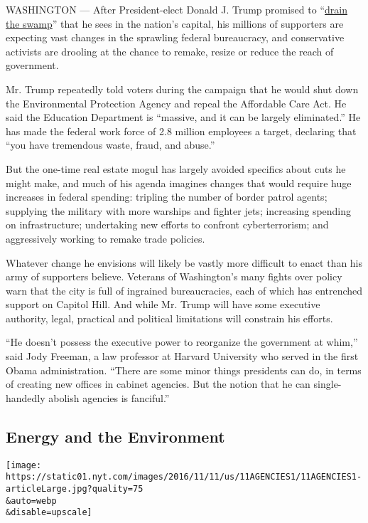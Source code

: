 WASHINGTON --- After President-elect Donald J. Trump promised to
``\href{https://www.nytimes.com/2020/07/06/us/politics/trump-lobbyists-swamp-campaign.html}{drain
the swamp}'' that he sees in the nation's capital, his millions of
supporters are expecting vast changes in the sprawling federal
bureaucracy, and conservative activists are drooling at the chance to
remake, resize or reduce the reach of government.

Mr. Trump repeatedly told voters during the campaign that he would shut
down the Environmental Protection Agency and repeal the Affordable Care
Act. He said the Education Department is ``massive, and it can be
largely eliminated.'' He has made the federal work force of 2.8 million
employees a target, declaring that ``you have tremendous waste, fraud,
and abuse.''

But the one-time real estate mogul has largely avoided specifics about
cuts he might make, and much of his agenda imagines changes that would
require huge increases in federal spending: tripling the number of
border patrol agents; supplying the military with more warships and
fighter jets; increasing spending on infrastructure; undertaking new
efforts to confront cyberterrorism; and aggressively working to remake
trade policies.

Whatever change he envisions will likely be vastly more difficult to
enact than his army of supporters believe. Veterans of Washington's many
fights over policy warn that the city is full of ingrained
bureaucracies, each of which has entrenched support on Capitol Hill. And
while Mr. Trump will have some executive authority, legal, practical and
political limitations will constrain his efforts.

``He doesn't possess the executive power to reorganize the government at
whim,'' said Jody Freeman, a law professor at Harvard University who
served in the first Obama administration. ``There are some minor things
presidents can do, in terms of creating new offices in cabinet agencies.
But the notion that he can single-handedly abolish agencies is
fanciful.''

\hypertarget{energy-and-the-environment}{%
\subsection{Energy and the
Environment}\label{energy-and-the-environment}}

\texttt{[image: https://static01.nyt.com/images/2016/11/11/us/11AGENCIES1/11AGENCIES1-articleLarge.jpg?quality=75\\\&auto=webp\\\&disable=upscale]}


